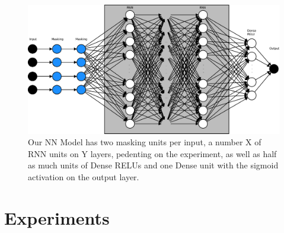 \documentclass[
	ngerman,
	ruledheaders=section,%
	class=report,%
	thesis={type=bachelor},%
	accentcolor=9c,%
	custommargins=true,%
	marginpar=false,%
	parskip=half-,%
	fontsize=11pt,%
	twoside
]{tudapub}
\begin{document}
\begin{figure}
    \includegraphics[width=\textwidth]{Model.pdf}
    \caption{Our NN Model has two masking units per input, a number X of RNN units on Y layers, pedenting on the experiment, as well as half as much units of Dense RELUs and one Dense unit with the sigmoid activation on the output layer.}
    \label{fig:Model}
\end{figure}





\chapter{Experiments}
\label{sec:experiments}
\end{document}
